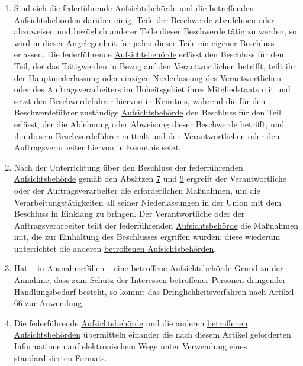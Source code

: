 \begin{enumerate}
  \item Sind sich die federführende \hyperref[itm:04-21]{Aufsichtsbehörde} und die betreffenden \hyperref[itm:04-21]{Aufsichtsbehörden} darüber einig, Teile der
   Beschwerde abzulehnen oder abzuweisen und bezüglich anderer Teile dieser Beschwerde tätig zu werden, so wird in
   dieser Angelegenheit für jeden dieser Teile ein eigener Beschluss erlassen. Die federführende \hyperref[itm:04-21]{Aufsichtsbehörde}
   erlässt den Beschluss für den Teil, der das Tätigwerden in Bezug auf den Verantwortlichen betrifft, teilt ihn der
   Hauptniederlassung oder einzigen Niederlassung des Verantwortlichen oder des Auftragsverarbeiters im Hoheitsgebiet
   ihres Mitgliedstaats mit und setzt den Beschwerdeführer hiervon in Kenntnis, während die für den Beschwerdeführer
   zuständige \hyperref[itm:04-21]{Aufsichtsbehörde} den Beschluss für den Teil erlässt, der die Ablehnung oder Abweisung dieser Beschwerde
   betrifft, und ihn diesem Beschwerdeführer mitteilt und den Verantwortlichen oder den Auftragsverarbeiter hiervon in
   Kenntnis setzt.
  \label{itm:60-9}

  \item Nach der Unterrichtung über den Beschluss der federführenden \hyperref[itm:04-21]{Aufsichtsbehörde} gemäß den Absätzen \hyperref
   [itm:60-7]{7} und \hyperref[itm:60-9]{9} ergreift der Verantwortliche oder der Auftragsverarbeiter die
   erforderlichen Maßnahmen, um die Verarbeitungstätigkeiten all seiner Niederlassungen in der Union mit dem Beschluss
   in Einklang zu bringen. Der Verantwortliche oder der Auftragsverarbeiter teilt der federführenden \hyperref[itm:04-21]{Aufsichtsbehörde}
   die Maßnahmen mit, die zur Einhaltung des Beschlusses ergriffen wurden; diese wiederum unterrichtet die anderen
   \hyperref[itm:04-22]{betroffenen Aufsichtsbehörden}.
  \label{itm:60-10}

  \item Hat -- in Ausnahmefällen -- eine \hyperref[itm:04-22]{betroffene Aufsichtsbehörde} Grund zu der Annahme, dass zum Schutz der
   Interessen \hyperref[itm:04-1]{betroffener Personen} dringender Handlungsbedarf besteht, so kommt das Dringlichkeitsverfahren nach
   \hyperref[ch:66]{Artikel 66} zur Anwendung.
  \label{itm:60-11}

  \item Die federführende \hyperref[itm:04-21]{Aufsichtsbehörde} und die anderen \hyperref[itm:04-22]{betroffenen Aufsichtsbehörden} übermitteln einander die nach
   diesem Artikel geforderten Informationen auf elektronischem Wege unter Verwendung eines standardisierten Formats.
  \label{itm:60-12}

\end{enumerate}


